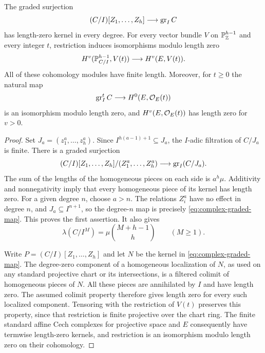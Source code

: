 \begin{lemma}\label{lem:complex-graded-comparison}
The graded surjection
\begin{equation}\label{eq:complex-graded-map}
 (C/I)[Z_1,\ldots,Z_h]\longrightarrow\operatorname{gr}_I C
\end{equation}
has length-zero kernel in every degree. For every vector bundle $V$ on
$\mathbb P_\mathbb Z^{h-1}$ and every integer $t$, restriction induces isomorphisms
modulo length zero
\[
 H^v(\mathbb P_{C/I}^{h-1},V(t))\longrightarrow H^v(E,V(t)).
\]
All of these cohomology modules have finite length. Moreover, for $t\geq0$
the natural map
\[
 \operatorname{gr}_I^t C\longrightarrow H^0(E,\mathcal O_E(t))
\]
is an isomorphism modulo length zero, and $H^v(E,\mathcal O_E(t))$ has length
zero for $v>0$.
\end{lemma}
\begin{proof}
Set $J_a=(z_1^a,\ldots,z_h^a)$. Since
$I^{h(a-1)+1}\subseteq J_a$, the $I$-adic filtration of $C/J_a$ is finite.
There is a graded surjection
\[
 (C/I)[Z_1,\ldots,Z_h]/(Z_1^a,\ldots,Z_h^a)
 \longrightarrow\operatorname{gr}_I(C/J_a).
\]
The sum of the lengths of the homogeneous pieces on each side is $a^h\mu$.
Additivity and nonnegativity imply that every homogeneous piece of its
kernel has length zero. For a given degree $n$, choose $a>n$. The relations
$Z_i^a$ have no effect in degree $n$, and $J_a\subseteq I^{n+1}$, so the
degree-$n$ map is precisely \eqref{eq:complex-graded-map}. This proves the
first assertion. It also gives
\begin{equation}\label{eq:complex-power-colength}
 \lambda(C/I^M)=\mu\binom{M+h-1}{h}\qquad(M\geq1).
\end{equation}

Write $P=(C/I)[Z_1,\ldots,Z_h]$ and let $N$ be the kernel in
\eqref{eq:complex-graded-map}. The degree-zero component of a homogeneous
localization of $N$, as used on any standard projective chart or its
intersections, is a filtered colimit of homogeneous pieces of $N$.
All these pieces are annihilated by $I$ and have length zero. The assumed
colimit property therefore gives length zero for every such localized
component. Tensoring with the restriction of $V(t)$ preserves this
property, since that restriction is finite projective over the chart ring.
The finite standard affine Cech complexes for projective space and $E$
consequently have termwise length-zero kernels, and restriction is an
isomorphism modulo length zero on their cohomology.


\end{proof}
